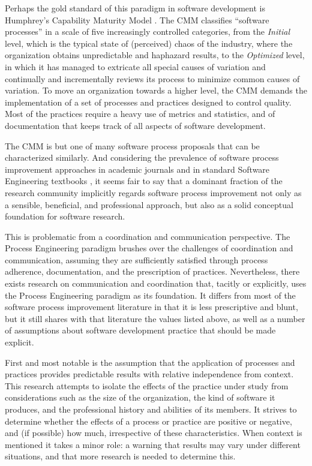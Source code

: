 Perhaps the gold standard of this paradigm in software development is Humphrey's Capability Maturity Model \cite{Humphrey1989}. The CMM classifies ``software processes'' in a scale of five increasingly controlled categories, from the \emph{Initial} level, which is the typical state of (perceived) chaos of the industry, where the organization obtains unpredictable and haphazard results, to the \emph{Optimized} level, in which it has managed to extricate all special causes of variation \cite{Deming1986} and continually and incrementally reviews its process to minimize common causes of variation. To move an organization towards a higher level, the CMM demands the implementation of a set of processes and practices designed to control quality. Most of the practices require a heavy use of metrics and statistics, and of documentation that keeps track of all aspects of software development.

The CMM is but one of many software process proposals that can be characterized similarly. And considering the prevalence of software process improvement approaches in academic journals and in standard Software Engineering textbooks \cite{Pressman2004,Pfleeger2001,Ghezzi2003}, it seems fair to say that a dominant fraction of the research community implicitly regards software process improvement not only as a sensible, beneficial, and professional approach, but also as a solid conceptual foundation for software research.

This is problematic from a coordination and communication perspective. The Process Engineering paradigm brushes over the challenges of coordination and communication, assuming they are sufficiently satisfied through process adherence, documentation, and the prescription of practices. Nevertheless, there exists research on communication and coordination that, tacitly or explicitly, uses the Process Engineering paradigm as its foundation. It differs from most of the software process improvement literature in that it is less prescriptive and blunt, but it still shares with that literature the values listed above, as well as a number of assumptions about software development practice that should be made explicit.

First and most notable is the assumption that the application of processes and practices provides predictable results with relative independence from context. This research attempts to isolate the effects of the practice under study from considerations such as the size of the organization, the kind of software it produces, and the professional history and abilities of its members. It strives to determine whether the effects of a process or practice are positive or negative, and (if possible) how much, irrespective of these characteristics. When context is mentioned it takes a minor role: a warning that results may vary under different situations, and that more research is needed to determine this.

